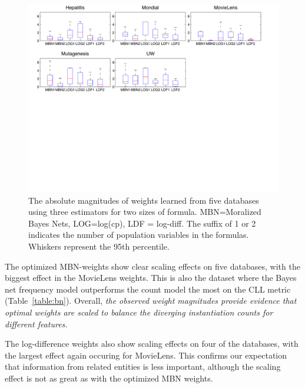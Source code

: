 \documentclass[twoside,11pt]{article}
\begin{document}
\begin{figure}[htbp]
\begin{center}
\includegraphics[width=1\textwidth]{boxplots}
\caption{The absolute magnitudes of weights learned from five databases using three estimators for two sizes of formula. MBN=Moralized Bayes Nets, LOG=log(cp), LDF = log-diff. The suffix of 1 or 2 indicates the number of population variables in the formulas. Whiskers represent the 95th percentile.}
\label{fig:boxplots}
\end{center}
\end{figure}

The optimized MBN-weights show clear scaling effects on five databases, with the biggest effect in the MovieLens weights. This is also the dataset where the Bayes net frequency model outperforms
the count model the most on the CLL metric (Table~\ref{table:bn}). Overall, {\em the observed weight magnitudes provide evidence that optimal weights are scaled to balance the diverging instantiation counts for different features.} 

The log-difference weights also show scaling effects on four of the databases, with the largest effect again occuring for MovieLens. This confirms our expectation that information from related entities is less important, although the scaling effect is not as great as with the optimized MBN weights. 
\end{document}
